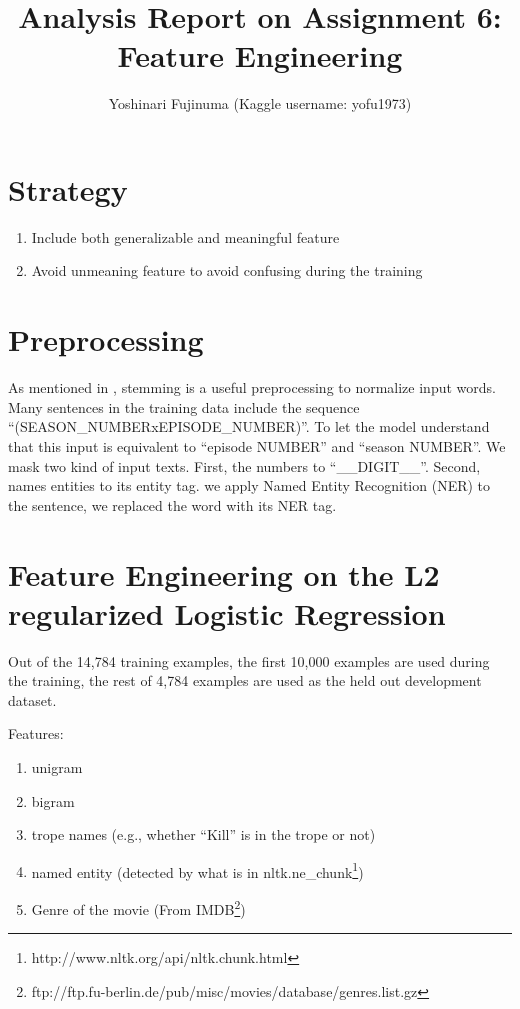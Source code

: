 \documentclass[11pt]{article}
\begin{document}
\title{Analysis Report on Assignment 6: Feature Engineering}
\author{Yoshinari Fujinuma (Kaggle username: yofu1973)}
\date{}
\maketitle

\section{Strategy}
\begin{enumerate}
 \item Include both generalizable and meaningful feature 
 \item Avoid unmeaning feature to avoid confusing during the training
\end{enumerate}

\section{Preprocessing}
As mentioned in \cite{Boyd-Graber:Glasgow:Zajac-2013}, stemming is a useful preprocessing to normalize input words. 
Many sentences in the training data include the sequence ``(SEASON\_NUMBERxEPISODE\_NUMBER)''. 
To let the model understand that this input is equivalent to ``episode NUMBER'' and ``season NUMBER''. 
We mask two kind of input texts. First, the numbers to ``\_\_DIGIT\_\_''. 
Second, names entities to its entity tag. we apply Named Entity Recognition (NER) to the sentence, we replaced the word with its NER tag.

\section{Feature Engineering on the L2 regularized Logistic Regression}

Out of the 14,784 training examples, the first 10,000 examples are used during the training, the rest of 4,784 examples are used as the held out development dataset.

Features:
\begin{enumerate}
 \item unigram
 \item bigram
 \item trope names (e.g., whether ``Kill'' is in the trope or not)
 \item named entity (detected by what is in nltk.ne\_chunk\footnote{http://www.nltk.org/api/nltk.chunk.html})
 \item Genre of the movie (From IMDB\footnote{ftp://ftp.fu-berlin.de/pub/misc/movies/database/genres.list.gz})
\end{enumerate}
\end{document}
